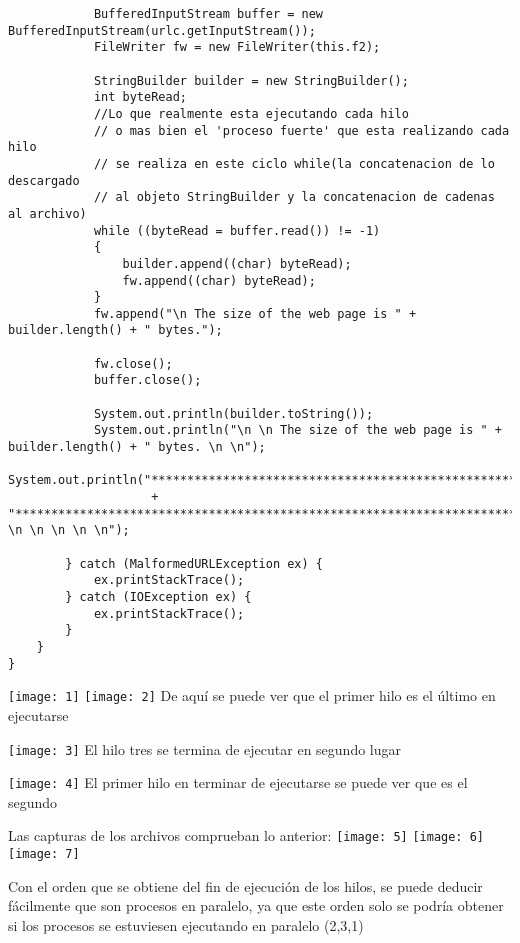 \documentclass[12pt]{article} %
\begin{document}
\begin{lstlisting}
            BufferedInputStream buffer = new BufferedInputStream(urlc.getInputStream());
            FileWriter fw = new FileWriter(this.f2);
 
            StringBuilder builder = new StringBuilder();
            int byteRead;
            //Lo que realmente esta ejecutando cada hilo
            // o mas bien el 'proceso fuerte' que esta realizando cada hilo
            // se realiza en este ciclo while(la concatenacion de lo descargado
            // al objeto StringBuilder y la concatenacion de cadenas al archivo)
            while ((byteRead = buffer.read()) != -1)
            {
                builder.append((char) byteRead);
                fw.append((char) byteRead);                
            }
            fw.append("\n The size of the web page is " + builder.length() + " bytes.");
            
            fw.close();
            buffer.close();
            
            System.out.println(builder.toString());
            System.out.println("\n \n The size of the web page is " + builder.length() + " bytes. \n \n");
            System.out.println("***************************************************************"
                    + "****************************************************************************************** \n \n \n \n \n");
 
        } catch (MalformedURLException ex) {
            ex.printStackTrace();
        } catch (IOException ex) {
            ex.printStackTrace();
        }
    }   
}
\end{lstlisting}

\texttt{[image: 1]}
\texttt{[image: 2]}
De aquí se puede ver que el primer hilo es el último en ejecutarse

\texttt{[image: 3]}
El hilo tres se termina de ejecutar en segundo lugar

\texttt{[image: 4]}
El primer hilo en terminar de ejecutarse se puede ver que es el segundo


Las capturas de los archivos comprueban lo anterior:
\texttt{[image: 5]}
\texttt{[image: 6]}
\texttt{[image: 7]}

Con el orden que se obtiene del fin de ejecución de los hilos, se puede deducir fácilmente que son procesos en paralelo, ya que este orden solo se podría obtener si los procesos se estuviesen ejecutando en paralelo (2,3,1)
\end{document}
